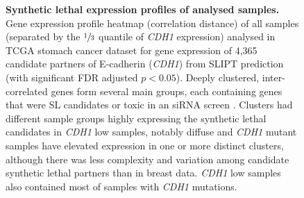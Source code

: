 \begin{figure}[!ht]
  \centering
    \caption[Synthetic lethal expression profiles of stomach samples]{\small \textbf{Synthetic lethal expression profiles of analysed samples.} Gene expression profile heatmap (correlation distance) of all samples (separated by the $\sfrac{1}{3}$ quantile of \textit{CDH1} expression) analysed in TCGA stomach cancer dataset for gene expression of 4,365 candidate partners of E-cadherin (\textit{CDH1}) from \gls{SLIPT} prediction (with significant FDR adjusted $p < 0.05$). Deeply clustered, inter-correlated genes form several main groups, each containing genes that were SL candidates or toxic in an siRNA screen \cite{Telford2015}. Clusters had different sample groups highly expressing the synthetic lethal candidates in \textit{CDH1} low samples, notably diffuse and \textit{CDH1} mutant samples have elevated expression in one or more distinct clusters, although there was less complexity and variation among candidate synthetic lethal partners than in breast data. \textit{CDH1} low samples also contained most of samples with \textit{CDH1} mutations.
}
\label{fig:slipt_expr_stad}
\end{figure}

